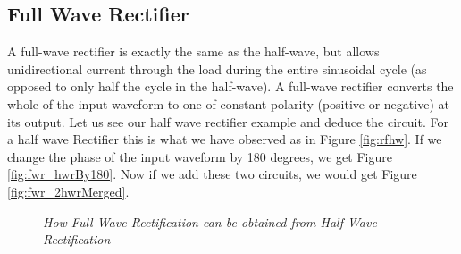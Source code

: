 		\subsection{Full Wave Rectifier}
			A full-wave rectifier is exactly the same as the half-wave, but allows unidirectional current through the load during the entire sinusoidal cycle (as opposed to only half the cycle in the half-wave). A full-wave rectifier converts the whole of the input waveform to one of constant polarity (positive or negative) at its output. Let us see our half wave rectifier example and deduce the circuit.					
			For a half wave Rectifier this is what we have observed as in Figure \ref{fig:rfhw}. If we change the phase of the input waveform by 180 degrees, we get Figure \ref{fig:fwr_hwrBy180}. Now if we add these two circuits, we would get Figure \ref{fig:fwr_2hwrMerged}.
			\begin{figure}[ht]
				\centering 
				\vfill
				\vfill
				\caption{\textit{How Full Wave Rectification can be obtained from Half-Wave Rectification}}
			\end{figure}
		
